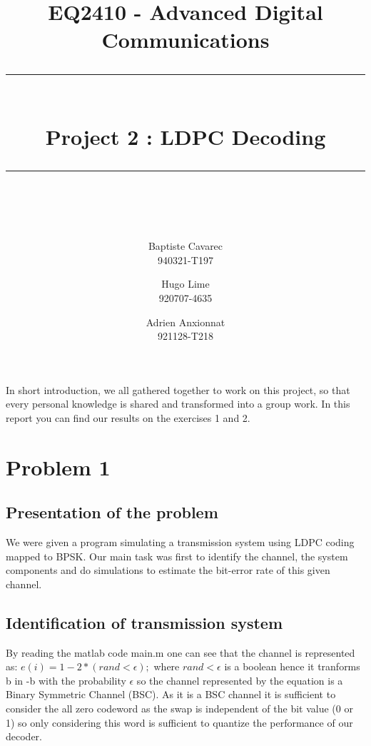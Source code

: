 \documentclass[a4paper]{article}
\begin{document}
\newcommand{\HRule}{\rule{\linewidth}{0.5mm}} 
\title{{\LARGE EQ2410 - Advanced Digital Communications} \\[0.5cm] \HRule \\[0.4cm]{Project 2 : LDPC Decoding}\\[0.2cm] \HRule \\[0.5cm] }
\author{Baptiste Cavarec \\ 940321-T197 \and Hugo Lime\\  920707-4635 \and Adrien Anxionnat\\ 921128-T218}

\maketitle
\abstract
In short introduction, we all gathered together to work on this project, so that every personal knowledge is shared and transformed into a group work. In this report you can find our results on the exercises 1 and 2.
\section{Problem 1}
\subsection{Presentation of the problem}
We were given a program simulating a transmission system using LDPC coding mapped to BPSK. Our main task was first to identify the channel, the system components and do simulations to estimate the bit-error rate of this given channel.
\subsection{Identification of transmission system}

By reading the matlab code main.m one can see that the channel is represented as: $e(i)= 1-2*(rand<\epsilon);$ where $rand<\epsilon$ is a boolean hence it tranforms b in -b with the probability $\epsilon$ so the channel represented by the equation is a Binary Symmetric Channel (BSC).
As it is a BSC channel it is sufficient to consider the all zero codeword as the swap is independent of the bit value (0 or 1) so only considering this word is sufficient to quantize the performance of our decoder.
\end{document}
